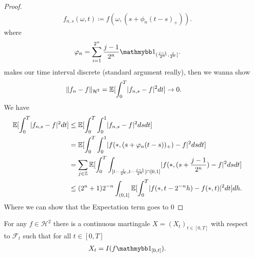 \begin{proof}
\begin{align*}
  f_{n,s}(\omega ,t) \coloneqq  f(\omega ,(s+\phi_n(t-s)_+))
.\end{align*}
where
\begin{align*}
  \phi_n = \sum_{i=1}^{2^n} \frac{j-1}{2^{n} }\cha_{(\frac{j-1}{2^{n}  },\frac{j}{2^{n} }]}
.\end{align*}
makes our time interval discrete (standard argument really), then we wanna show 
\begin{align*}
  \|f_n-f\|_{\mathcal{H}^2}&= \mathbb{E}[\int_0^{T} \lvert f_{n,s}-f\rvert^2 dt ] \to 0
.\end{align*}
We have 
\begin{align*}
  \mathbb{E}[\int_0^{T} \lvert f_{n,s}-f\rvert^2 dt ] &\le \mathbb{E}[\int_0^{T} \int_0^{1} \lvert f_{n,s}-f\rvert^2 ds dt]\\
                                       &= \mathbb{E}[\int_0^{T} \int_0^{1} \lvert f(*,(s+\varphi_n(t-s))_+)-f\rvert^2 ds dt]\\
                                       &=  \sum_{j\in \mathbb{Z}}\mathbb{E}[\int_0^{T} \int_{[t-\frac{j}{2^{n} },t-\frac{j-1}{2^{n} }] \cap [0,1]} \lvert f(*,(s+\frac{j-1}{2^{n} })-f\rvert^2 ds dt]\\
                                       &\le (2^{n}+1 )2^{-n}  \int_{(0,1]} \mathbb{E}[\int_0^{T}\lvert f(*,t-2^{-n}h )-f(*,t)\rvert^2 dt ]dh 
.\end{align*}
Where we can show that the Expectation term goes to 0
\end{proof}
\begin{Theorem}[3.7.]
  For any $f \in  \mathcal{H}^2$ there is a continuous martingale $X = (X_t)_{t \in  [0,T]}$ with 
  respect to $\mathcal{F}_t$ such that for all $t \in  [0,T]$
  \begin{align*}
    X_t = I(f \cha_{[0,t]})
  .\end{align*} 
\end{Theorem}
